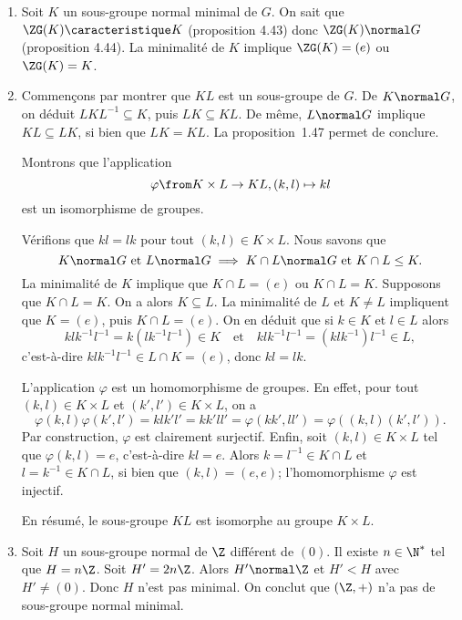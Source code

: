 \begin{enumerate} 
  \item 
    Soit $K$ un sous-groupe normal minimal de $G$. On sait que
    $\ZG(K)\caracteristique K$ (proposition 4.43) donc $\ZG(K)\normal G$
    (proposition 4.44).  La minimalité de $K$ implique $\ZG(K) = (e)$ ou
    $\ZG(K) = K$.

  \item
    Commençons par montrer que $KL$ est un sous-groupe de $G$.
    De $K\normal G$, on déduit $LKL^{-1}\subseteq K$, puis $LK\subseteq KL$.
    De même, $L\normal G$ implique $KL\subseteq LK$, si bien que $LK = KL$.
    La proposition~1.47 permet de conclure.

    Montrons que l'application
    \[
      \varphi\from K\times L\to KL, 
      (k,l) \mapsto kl
    \]
    est un isomorphisme de groupes.

    Vérifions que $kl = lk$ pour tout $(k,l)\in K\times L$. Nous savons
    que 
    \[
      K\normal G\text{ et } L\normal G
      \implies K\cap L\normal G\text{ et } K\cap L\leq K.
    \]
    La minimalité de $K$ implique que $K\cap L = (e)$ ou $K\cap L = K$.
    Supposons que $K\cap L = K$. On a alors $K\subseteq  L$.  La minimalité de
    $L$ et $K\neq L$ impliquent que $K = (e)$, puis $K\cap L = (e)$.  On en
    déduit que si $k\in K$ et $l\in L$ alors
    \[
      klk^{-1}l^{-1} = k(lk^{-1}l^{-1})\in K
      \quad\text{et}\quad
      klk^{-1}l^{-1} = (klk^{-1})l^{-1}\in L,
    \]
    c'est-à-dire $klk^{-1}l^{-1}\in L\cap K = (e)$, donc $kl = lk$.
    
    L'application $\varphi$ est un homomorphisme de groupes. En effet, pour
    tout $(k,l)\in K\times L$ et $(k',l')\in K\times L$, on a
    \[
      \varphi(k,l)\varphi(k',l')
      = klk'l'=kk'll'
      = \varphi(kk',ll')
      = \varphi((k,l)(k',l')).
    \]
    Par construction, $\varphi$ est clairement surjectif. Enfin, soit
    $(k,l)\in K\times L$ tel que $\varphi(k,l) = e$, c'est-à-dire $kl = e$.
    Alors $k = l^{-1}\in K\cap L$ et $l = k^{-1}\in K\cap L$, si bien que $(k,l) = (e,e)$;
    l'homomorphisme $\varphi$ est injectif.

    En résumé, le sous-groupe $KL$ est isomorphe au groupe $K\times L$.

  \item 
    Soit $H$ un sous-groupe normal de $\Z$ différent de $(0)$.  Il existe
    $n\in\N^*$ tel que $H = n\Z$. Soit $H' = 2n\Z$. Alors $H'\normal \Z$ et
    $H'<H$ avec $H'\neq (0)$. Donc $H$ n'est pas minimal. On conclut que
    $(\Z,+)$ n'a pas de sous-groupe normal minimal.
\end{enumerate}

